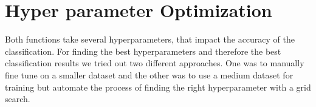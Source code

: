 \documentclass[conference]{IEEEtran}
\begin{document}
\section{Hyper parameter Optimization}
Both functions take several hyperparameters, that impact the accuracy of the classification. For finding the best hyperparameters and therefore the best classification results we tried out two different approaches. One was to manually fine tune on a smaller dataset and the other was to use a medium dataset for training but automate the process of finding the right hyperparameter with a grid search.
\begin{figure}[ht!]
    \centering

    \quad
    \quad
    \quad
    
     \quad
    \quad
    \quad   


\end{figure}
\end{document}
